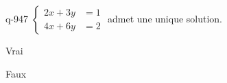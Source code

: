 \begin{truefalse}{q-947}
$\begin{cases}2x+3y &= 1 \\ 4x+6y &= 2\end{cases}$ admet une unique solution.
\item Vrai
\item* Faux
\end{truefalse}

